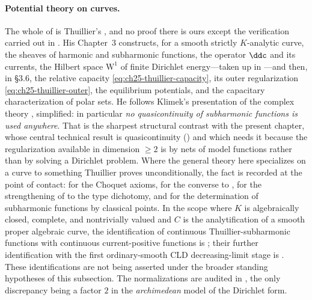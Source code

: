 \paragraph{Potential theory on curves.}  The whole of
 is Thuillier's \cite{Thu05}, and no proof there is
ours except the verification carried out in
.  His Chapter~3 constructs, for a smooth
strictly \(K\)-analytic curve, the sheaves of harmonic and subharmonic
functions, the operator \(\ddc\) and its currents, the Hilbert space
\(\mathrm W^1\) of finite Dirichlet energy---taken up in
---and then, in \S3.6, the relative capacity
\eqref{eq:ch25-thuillier-capacity}, its outer regularization
\eqref{eq:ch25-thuillier-outer}, the equilibrium potentials, and the
capacitary characterization of polar sets.  He follows Klimek's presentation
of the complex theory \cite{Kl91}, simplified: in particular
\emph{no quasicontinuity of subharmonic functions is used anywhere}.  That
is the sharpest structural contrast with the present chapter, whose central
technical result is quasicontinuity
() and which needs it because the
regularization available in dimension \(\geq2\) is by nets of model
functions rather than by solving a Dirichlet problem.  Where the general
theory here specializes on a curve to something Thuillier proves
unconditionally, the fact is recorded at the point of contact:
 for the Choquet axioms,
 for the converse to
,  for the
strengthening of  to the type
dichotomy, and  for the determination
of subharmonic functions by classical points.  In the scope where $K$ is
algebraically closed, complete, and nontrivially valued and $C$ is the
analytification of a smooth proper algebraic curve, the identification of
continuous Thuillier-subharmonic functions with continuous current-positive
functions is ; their further identification
with the first ordinary-smooth CLD decreasing-limit stage is
.  These identifications
are not being asserted under the broader standing hypotheses of this
subsection.  The normalizations are audited in
, the
only discrepancy being a factor \(2\) in the \emph{archimedean} model of the
Dirichlet form.

